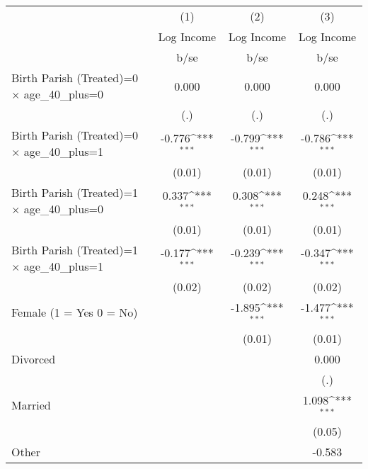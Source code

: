 {
\def\sym#1{\ifmmode^{#1}\else\(^{#1}\)\fi}
\begin{tabular}{l*{3}{c}}
\hline\hline
                    &\multicolumn{1}{c}{(1)}&\multicolumn{1}{c}{(2)}&\multicolumn{1}{c}{(3)}\\
                    &\multicolumn{1}{c}{Log Income}&\multicolumn{1}{c}{Log Income}&\multicolumn{1}{c}{Log Income}\\
                    &        b/se         &        b/se         &        b/se         \\
\hline
Birth Parish (Treated)=0 $\times$ age\_40\_plus=0&       0.000         &       0.000         &       0.000         \\
                    &         (.)         &         (.)         &         (.)         \\
Birth Parish (Treated)=0 $\times$ age\_40\_plus=1&      -0.776\sym{***}&      -0.799\sym{***}&      -0.786\sym{***}\\
                    &      (0.01)         &      (0.01)         &      (0.01)         \\
Birth Parish (Treated)=1 $\times$ age\_40\_plus=0&       0.337\sym{***}&       0.308\sym{***}&       0.248\sym{***}\\
                    &      (0.01)         &      (0.01)         &      (0.01)         \\
Birth Parish (Treated)=1 $\times$ age\_40\_plus=1&      -0.177\sym{***}&      -0.239\sym{***}&      -0.347\sym{***}\\
                    &      (0.02)         &      (0.02)         &      (0.02)         \\
Female (1 = Yes 0 = No)&                     &      -1.895\sym{***}&      -1.477\sym{***}\\
                    &                     &      (0.01)         &      (0.01)         \\
Divorced            &                     &                     &       0.000         \\
                    &                     &                     &         (.)         \\
Married             &                     &                     &       1.098\sym{***}\\
                    &                     &                     &      (0.05)         \\
Other               &                     &                     &      -0.583         \\

\end{tabular}}
